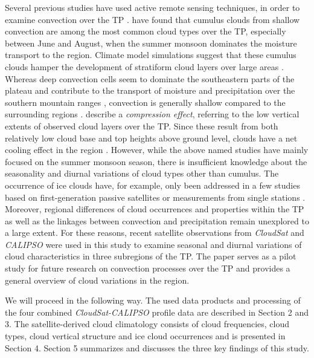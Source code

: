 \documentclass[alpha-refs]{wiley-article}
\begin{document}
Several previous studies have used active remote sensing techniques, in order to examine convection over the TP \citep{cu13, cu16, cu16_2, cu17,cu17_2, cu17_4, himawari2018diurnal}. \citet{cu16} have found that cumulus clouds from shallow convection are among the most common cloud types over the TP, especially between June and August, when the summer monsoon dominates the moisture transport to the region. Climate model simulations suggest that these cumulus clouds hamper the development of stratiform cloud layers over large areas \citep{cu17_6}. Whereas deep convection cells seem to dominate the southeastern parts of the plateau \citep{cu08, shallowconvection2011intercomparison, m11_2} and contribute to the transport of moisture and precipitation over the southern mountain ranges \citep{cu16_5}, convection is generally shallow compared to the surrounding regions \citep{shallowconvection2011intercomparison}. \citet{cu17_4} describe a \textit{compression effect}, referring to the low vertical extents of observed cloud layers over the TP. Since these result from both relatively low cloud base and top heights above ground level, clouds have a net cooling effect in the region \citep{cu17_4}. However, while the above named studies have mainly focused on the summer monsoon season, there is insufficient knowledge about the seasonality and diurnal variations of cloud types other than cumulus. The occurrence of ice clouds have, for example, only been addressed in a few studies based on first-generation passive satellites \citep{cirrus2005MODIS} or measurements from single stations \citep{cirrus2013naqu}. Moreover, regional differences of cloud occurrences and properties within the TP as well as the linkages between convection and precipitation remain unexplored to a large extent. For these reasons, recent satellite observations from \textit{CloudSat} and \textit{CALIPSO} were used in this study to examine seasonal and diurnal variations of cloud characteristics in three subregions of the TP. The paper serves as a pilot study for future research on convection processes over the TP and provides a general overview of cloud variations in the region. 


We will proceed in the following way. The used data products and processing of the four combined \textit{CloudSat-CALIPSO} profile data are described in Section 2 and 3. The satellite-derived cloud climatology consists of cloud frequencies, cloud types, cloud vertical structure and ice cloud occurrences and is presented in Section 4. Section 5 summarizes and discusses the three key findings of this study. 
\end{document}
